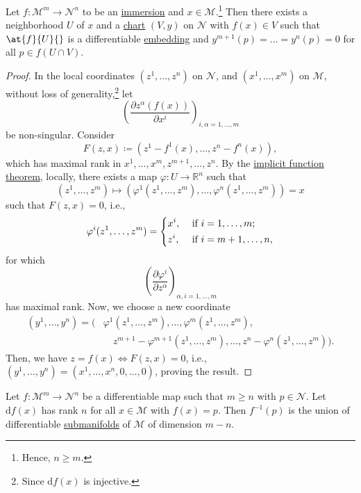 \begin{lemma}
	Let \(f\colon \mathcal{M}^m \to \mathcal{N}^n \) to be an \hyperref[def:immersion]{immersion} and \(x\in \mathcal{M} \).\footnote{Hence, \(n \geq m\).} Then there exists a neighborhood \(U\) of \(x\) and a \hyperref[def:coordinate-chart]{chart} \((V, y)\) on \(\mathcal{N} \) with \(f(x)\in V\) such that \(\at{f}{U}{}\) is a differentiable \hyperref[def:embedding]{embedding} and \(y^{m+1}(p) = \ldots = y^n(p) = 0\) for all \(p\in f(U \cap V)\).
\end{lemma}
\begin{proof}
	In the local coordinates \((z^1, \ldots , z^n)\) on \(\mathcal{N} \), and \((x^1, \ldots , x^m)\) on \(\mathcal{M} \), without loss of generality,\footnote{Since \(\mathrm{d} f(x)\) is injective.} let
	\[
		\left( \frac{\partial z^\alpha (f(x))}{\partial x^i} \right) _{i, \alpha = 1, \ldots , m}
	\]
	be non-singular. Consider
	\[
		F(z, x) \coloneqq \left( z^1 - f^1(x), \ldots , z^n - f^n(x) \right),
	\]
	which has maximal rank in \(x^1, \ldots , x^m, z^{m+1}, \ldots , z^n\). By the \href{https://en.wikipedia.org/wiki/Implicit_function_theorem#Generalizations}{implicit function theorem}, locally, there exists a map \(\varphi \colon U \to \mathbb{R} ^n\) such that
	\[
		(z^1, \ldots , z^m) \mapsto (\varphi ^1(z^1, \ldots , z^m) , \ldots , \varphi ^n(z^1, \ldots , z^m)) = x
	\]
	such that \(F(z, x) = 0\), i.e.,
	\[
		\varphi ^i(z^1, \ldots , z^m) = \begin{dcases}
			x^i,   & \text{ if } i = 1, \ldots , m ;  \\
			z^{i}, & \text{ if } i = m+1, \ldots , n,
		\end{dcases}
	\]
	for which
	\[
		\left( \frac{\partial \varphi ^i}{\partial z^\alpha } \right) _{\alpha , i = 1, \ldots , m}
	\]
	has maximal rank. Now, we choose a new coordinate
	\[
		\begin{split}
			(y^1, \ldots , y^n)
			= \big( &\varphi ^1(z^1, \ldots , z^m), \ldots , \varphi ^m (z^1, \ldots , z^m), \\
			&\quad z^{m+1} - \varphi ^{m+1}(z^1, \ldots , z^m), \ldots , z^n - \varphi ^n(z^1, \ldots , z^m) \big).
		\end{split}
	\]
	Then, we have \(z = f(x) \iff F(z, x) = 0\), i.e., \((y^1, \ldots , y^n) = (x^1, \ldots , x^n, 0, \ldots , 0)\), proving the result.
\end{proof}

\begin{lemma}
	Let \(f\colon \mathcal{M}^m \to \mathcal{N}^n \) be a differentiable map such that \(m \geq n\) with \(p\in \mathcal{N} \). Let \(\mathrm{d} f(x)\) has rank \(n\) for all \(x\in \mathcal{M} \) with \(f(x) = p\). Then \(f^{-1} (p)\) is the union of differentiable \hyperref[def:submanifold]{submanifolds} of \(\mathcal{M} \) of dimension \(m - n\).
\end{lemma}

